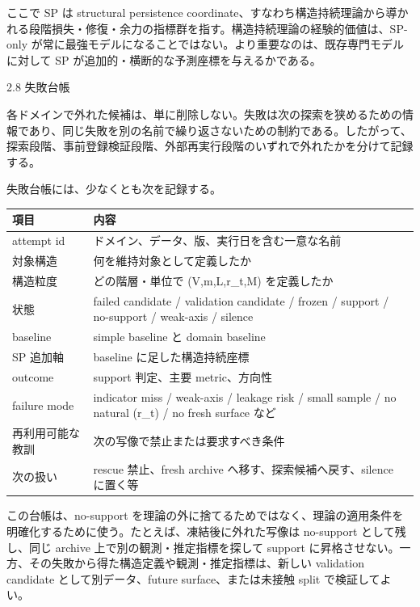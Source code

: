 \documentclass[12pt,a4paper]{article}
\begin{document}
ここで SP は structural persistence coordinate、すなわち構造持続理論から導かれる段階損失・修復・余力の指標群を指す。構造持続理論の経験的価値は、SP-only が常に最強モデルになることではない。より重要なのは、既存専門モデルに対して SP が追加的・横断的な予測座標を与えるかである。

2.8 失敗台帳

各ドメインで外れた候補は、単に削除しない。失敗は次の探索を狭めるための情報であり、同じ失敗を別の名前で繰り返さないための制約である。したがって、探索段階、事前登録検証段階、外部再実行段階のいずれで外れたかを分けて記録する。

失敗台帳には、少なくとも次を記録する。

{\def\LTcaptype{table} %
\begin{longtable}[]{@{}
  >{\raggedright\arraybackslash}p{}
  >{\raggedright\arraybackslash}p{}@{}}
\toprule\noalign{}
\begin{minipage}[b]{\linewidth}\raggedright
項目
\end{minipage} & \begin{minipage}[b]{\linewidth}\raggedright
内容
\end{minipage} \\
\midrule\noalign{}
\endhead
\bottomrule\noalign{}
\endlastfoot
attempt id & ドメイン、データ、版、実行日を含む一意な名前 \\
対象構造 & 何を維持対象として定義したか \\
構造粒度 & どの階層・単位で (V,m,L,r\_t,M) を定義したか \\
状態 & failed candidate / validation candidate / frozen / support / no-support / weak-axis / silence \\
baseline & simple baseline と domain baseline \\
SP 追加軸 & baseline に足した構造持続座標 \\
outcome & support 判定、主要 metric、方向性 \\
failure mode & indicator miss / weak-axis / leakage risk / small sample / no natural (r\_t) / no fresh surface など \\
再利用可能な教訓 & 次の写像で禁止または要求すべき条件 \\
次の扱い & rescue 禁止、fresh archive へ移す、探索候補へ戻す、silence に置く等 \\
\end{longtable}
}

この台帳は、no-support を理論の外に捨てるためではなく、理論の適用条件を明確化するために使う。たとえば、凍結後に外れた写像は no-support として残し、同じ archive 上で別の観測・推定指標を探して support に昇格させない。一方、その失敗から得た構造定義や観測・推定指標は、新しい validation candidate として別データ、future surface、または未接触 split で検証してよい。
\end{document}
